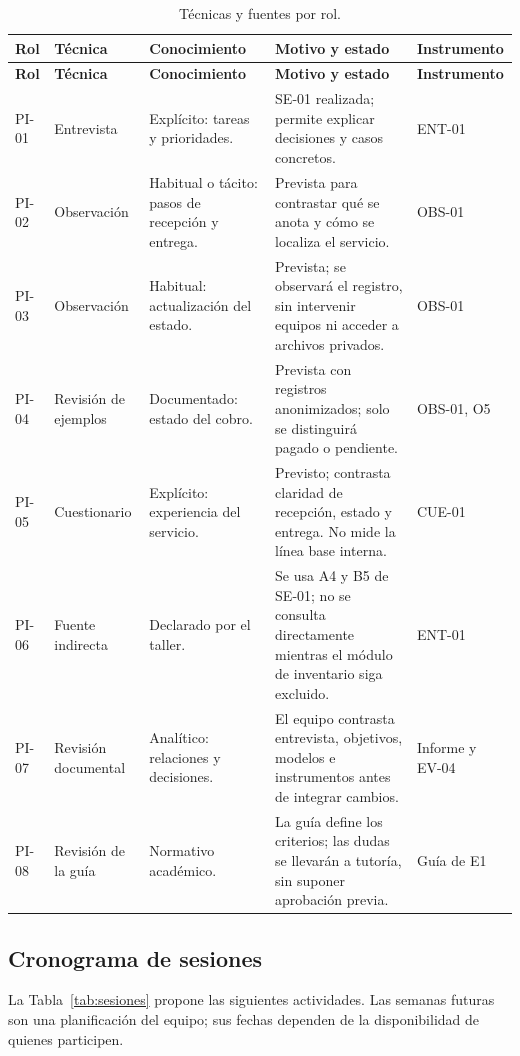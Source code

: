 \begingroup\small{}
\begin{longtable}{@{}L{1cm}L{2.7cm}L{2.4cm}L{5.7cm}L{1.8cm}@{}}
\caption{Técnicas y fuentes por rol.}\label{tab:tecnicas}\\
\toprule
\textbf{Rol} & \textbf{Técnica} & \textbf{Conoci\-miento} & \textbf{Motivo y estado} & \textbf{Instru\-mento} \\
\midrule\endfirsthead
\toprule
\textbf{Rol} & \textbf{Técnica} & \textbf{Conoci\-miento} & \textbf{Motivo y estado} & \textbf{Instru\-mento} \\
\midrule\endhead
\bottomrule\endfoot
PI-01 & Entrevista & Explícito: tareas y prioridades. & SE-01 realizada; permite explicar decisiones y casos concretos. & ENT-01 \\
PI-02 & Observación & Habitual o tácito: pasos de recepción y entrega. & Prevista para contrastar qué se anota y cómo se localiza el servicio. & OBS-01 \\
PI-03 & Observación & Habitual: actualización del estado. & Prevista; se observará el registro, sin intervenir equipos ni acceder a archivos privados. & OBS-01 \\
PI-04 & Revisión de ejemplos & Documentado: estado del cobro. & Prevista con registros anonimizados; solo se distinguirá pagado o pendiente. & OBS-01, O5 \\
PI-05 & Cuestionario & Explícito: experiencia del servicio. & Previsto; contrasta claridad de recepción, estado y entrega. No mide la línea base interna. & CUE-01 \\
PI-06 & Fuente indirecta & Declarado por el taller. & Se usa A4 y B5 de SE-01; no se consulta directamente mientras el módulo de inventario siga excluido. & ENT-01 \\
PI-07 & Revisión documental & Analítico: relaciones y decisiones. & El equipo contrasta entrevista, objetivos, modelos e instrumentos antes de integrar cambios. & Informe y EV-04 \\
PI-08 & Revisión de la guía & Normativo académico. & La guía define los criterios; las dudas se llevarán a tutoría, sin suponer aprobación previa. & Guía de E1 \\
\end{longtable}
\endgroup

\subsection{Cronograma de sesiones}
La Tabla~\ref{tab:sesiones} propone las siguientes actividades. Las semanas futuras son una
planificación del equipo; sus fechas dependen de la disponibilidad de quienes participen.

